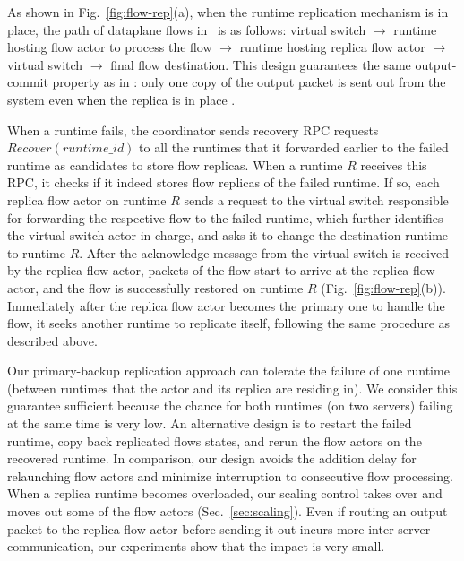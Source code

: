 As shown in Fig.~\ref{fig:flow-rep}(a), when the runtime replication mechanism is in place, the path of dataplane flows in \nfactor~is as follows: virtual switch $\rightarrow$ runtime hosting flow actor to process the flow $\rightarrow$ runtime hosting replica flow actor $\rightarrow$ virtual switch $\rightarrow$ final flow destination. This design guarantees the same output-commit property as in \cite{sherry2015rollback}: only one copy of the output packet is sent out from the system even when the replica is in place . %

 

When a runtime fails, the coordinator sends recovery RPC requests $Recover(runtime\_id) $ to all the runtimes that it forwarded earlier to the failed runtime as candidates to store flow replicas. When a runtime $R$ receives this RPC, it checks if it indeed stores flow replicas of the failed runtime. If so, each replica flow actor on runtime $R$ sends a request to the virtual switch responsible for forwarding the respective flow to the failed runtime, which further identifies the virtual switch actor in charge, and asks it to change the destination runtime to runtime $R$. After the acknowledge message from the virtual switch is received by the replica flow actor, packets of the flow start to arrive at the replica flow actor, and the flow is successfully restored on runtime $R$ (Fig.~\ref{fig:flow-rep}(b)). Immediately after the replica flow actor becomes the primary one to handle the flow, it seeks another runtime to replicate itself, following the same procedure as described above. 


Our primary-backup replication approach can tolerate the failure of one runtime (between runtimes that the actor and its replica are residing in). We consider this guarantee sufficient because the 
chance for both runtimes (on two servers) failing at the same time is very low. An alternative design is to restart the failed runtime, copy back replicated flows states, and rerun the flow actors on the recovered runtime. In comparison, our design avoids the addition delay for relaunching flow actors and minimize interruption to consecutive flow processing. When a replica runtime becomes overloaded, our scaling control takes over and moves out some of the flow actors (Sec.~\ref{sec:scaling}). Even if routing an output packet to the replica flow actor before sending it out incurs more inter-server communication, our experiments show that the impact is very small. 


